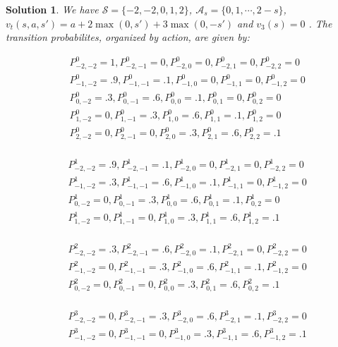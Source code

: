 \documentclass[12pt]{amsart}
\newtheorem{sol}[thm]{Solution}
\newcommand{\MA}{\mathcal{A}}
\newcommand{\MS}{\mathcal{S}}
\begin{document}
\begin{sol}
We have $\MS= \{-2, -2, 0, 1, 2\}$, $\MA_s = \{0, 1, \cdots,  2-s\}$, $v_t(s, a, s') = a + 2\max(0, s')+3\max(0,-s')$ and $v_3(s) = 0$ . The transition probabilites, organized by action, are given by:

\begin{align*}
&P^0_{-2,-2} = 1 ,P^0_{-2,-1} = 0, P^0_{-2,0} = 0, P^0_{-2,1} = 0, P^0_{-2,2} = 0\\
&P^0_{-1,-2} = .9, P^0_{-1,-1} = .1, P^0_{-1,0} = 0, P^0_{-1,1} = 0, P^0_{-1, 2} = 0\\ 
&P^0_{0,-2} = .3 ,P^0_{0,-1} = .6, P^0_{0,0} = .1, P^0_{0,1} = 0, P^0_{0,2} = 0\\
&P^0_{1,-2} = 0, P^0_{1,-1} = .3, P^0_{1,0} = .6, P^0_{1,1} = .1, P^0_{1, 2} = 0\\ 
&P^0_{2,-2} = 0 ,P^0_{2,-1} = 0, P^0_{2,0} = .3, P^0_{2,1} = .6, P^0_{2,2} = .1\\
\end{align*}

\begin{align*}
&P^1_{-2,-2} = .9 ,P^1_{-2,-1} = .1, P^1_{-2,0} = 0, P^1_{-2,1} = 0, P^1_{-2,2} = 0\\
&P^1_{-1,-2} = .3, P^1_{-1,-1} = .6, P^1_{-1,0} = .1, P^1_{-1,1} = 0, P^1_{-1, 2} = 0\\ 
&P^1_{0,-2} = 0 ,P^1_{0,-1} = .3, P^1_{0,0} = .6, P^1_{0,1} = .1, P^1_{0,2} = 0\\
&P^1_{1,-2} = 0, P^1_{1,-1} = 0, P^1_{1,0} = .3, P^1_{1,1} = .6, P^1_{1, 2} = .1\\ 
\end{align*}

\begin{align*}
&P^2_{-2,-2} = .3 ,P^2_{-2,-1} = .6, P^2_{-2,0} = .1, P^2_{-2,1} = 0, P^2_{-2,2} = 0\\
&P^2_{-1,-2} = 0, P^2_{-1,-1} = .3, P^2_{-1,0} = .6, P^2_{-1,1} = .1, P^2_{-1, 2} = 0\\ 
&P^2_{0,-2} = 0 ,P^2_{0,-1} = 0, P^2_{0,0} = .3, P^2_{0,1} = .6, P^2_{0,2} = .1\\ 
\end{align*}

\begin{align*}
&P^3_{-2,-2} = 0, P^3_{-2,-1} = .3, P^3_{-2,0} = .6, P^3_{-2,1} = .1, P^3_{-2,2} = 0\\
&P^3_{-1,-2} = 0, P^3_{-1,-1} = 0, P^3_{-1,0} = .3, P^3_{-1,1} = .6, P^3_{-1, 2} = .1\\ 
\end{align*}


\end{sol}
\end{document}
